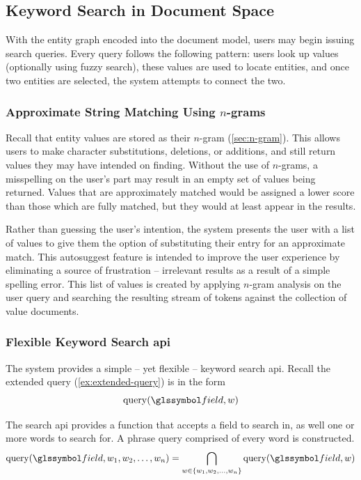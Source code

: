 	\subsection{Keyword Search in Document Space}
	\label{sec:keyword-search-document-space}
		With the entity graph encoded into the document model, users may begin issuing search queries.  Every query follows the following pattern:  users look up values (optionally using fuzzy search), these values are used to locate entities, and once two entities are selected, the system attempts to connect the two.
		
		\subsubsection{Approximate String Matching Using \(n\)-grams}
			Recall that entity values are stored as their \(n\)-gram (\cref{sec:n-gram}).  This allows users to make character substitutions, deletions, or additions, and still return values they may have intended on finding.  Without the use of \(n\)-grams, a misspelling on the user's part may result in an empty set of values being returned.  Values that are approximately matched would be assigned a lower score than those which are fully matched, but they would at least appear in the results.
			
			Rather than guessing the user's intention, the system presents the user with a list of values to give them the option of substituting their entry for an approximate match.  This autosuggest feature is intended to improve the user experience by eliminating a source of frustration -- irrelevant results as a result of a simple spelling error.  This list of values is created by applying \(n\)-gram analysis on the user query and searching the resulting stream of tokens against the collection of value documents.
		
		\subsubsection{Flexible Keyword Search \gls{api}}
			The system provides a simple -- yet flexible -- keyword search \gls{api}.  Recall the extended query (\cref{ex:extended-query}) is in the form
			\[
				\query(\field, \w)
			\]
			
			The search \gls{api} provides a function that accepts a field to search in, as well one or more words to search for.  A phrase query comprised of every word is constructed.
			\[
				\query(\field, \w_1, \w_2, \dotsc, \w_n) = \bigcap_{\w \in \{\w_1, \w_2, \dotsc, \w_n\}} \query(\field, \w)
			\]
			
